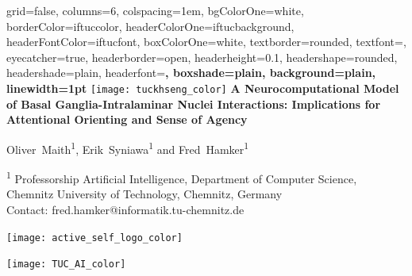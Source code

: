\documentclass[portrait,final,a0paper,fontscale=0.30]{baposter}
\begin{document}
\begin{poster}%
	{
		grid=false,
		columns=6,
		colspacing=1em,
		bgColorOne=white,
		borderColor=iftuccolor,
		headerColorOne=iftucbackground,
		headerFontColor=iftucfont,
		boxColorOne=white,
		textborder=rounded,
		textfont=\scriptsize,
		eyecatcher=true,
		headerborder=open,
		headerheight=0.1\textheight,
		headershape=rounded,
		headershade=plain,
		headerfont=\Large\bf, %
		boxshade=plain,
		background=plain,
		linewidth=1pt
	}
	{\texttt{[image: tuckhseng\_color]}} 
	{\large\bf{A Neurocomputational Model of Basal Ganglia-Intralaminar Nuclei Interactions: Implications for Attentional Orienting and Sense of Agency}\vspace{0.5em}}
	{\normalsize Oliver~Maith\textsuperscript{1}, Erik~Syniawa\textsuperscript{1} and Fred~Hamker\textsuperscript{1} \\ \vspace{0.5em}
		
	\small\textsuperscript{1} Professorship Artificial Intelligence, Department of Computer Science, \\ Chemnitz University of Technology, Chemnitz, Germany \\ \vspace{0.5em}
	\small Contact: fred.hamker@informatik.tu-chemnitz.de
	}
	{
		\begin{minipage}[r]{0.1\textwidth}
			\texttt{[image: active\_self\_logo\_color]}
		\end{minipage}
		\hfill
		\begin{minipage}[r]{0.1\textwidth}
			\texttt{[image: TUC\_AI\_color]}
		\end{minipage}
	}

\end{poster}
\end{document}
